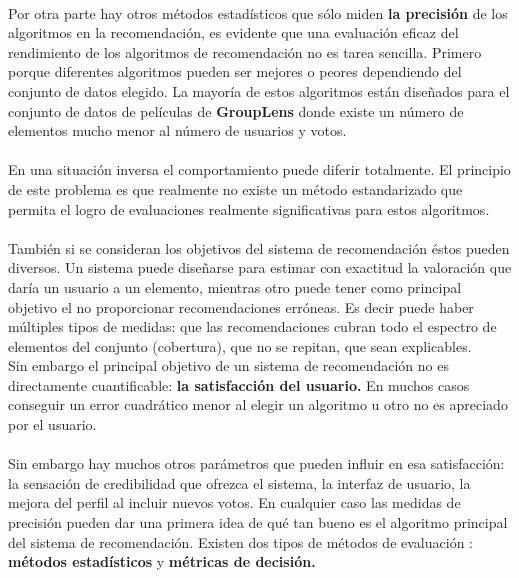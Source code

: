\documentclass[12pt,letterpaper,oneside] {memoir}
\begin{document}
\paragraph{}
Por otra parte hay otros métodos estadísticos que sólo miden \textbf{la precisión} de los algoritmos en la recomendación, es evidente que una evaluación eficaz del rendimiento de los algoritmos de recomendación no es tarea sencilla. Primero porque diferentes algoritmos pueden ser mejores o peores dependiendo del conjunto de datos elegido. La mayoría de estos algoritmos están diseñados para el conjunto de datos de películas de \textbf{GroupLens} donde existe un número de elementos mucho menor al número de usuarios y votos. 
\paragraph{}
En una situación inversa el comportamiento puede diferir totalmente. El principio de este problema es que realmente no existe un método estandarizado que permita el logro de evaluaciones realmente significativas para estos algoritmos.
\paragraph{}
También si se consideran los objetivos del sistema de recomendación éstos pueden diversos. Un sistema puede diseñarse para estimar con exactitud la valoración que daría un usuario a un elemento, mientras otro puede tener como principal objetivo el no proporcionar recomendaciones erróneas. Es decir puede haber múltiples tipos de medidas: que las recomendaciones cubran todo el espectro de elementos del conjunto (cobertura), que no se repitan, que sean explicables. \\
Sin embargo el principal objetivo de un sistema de recomendación no es directamente cuantificable: \textbf{la satisfacción del usuario.} En muchos casos conseguir un error cuadrático menor al elegir un algoritmo u otro no es apreciado por el usuario.
\paragraph{}
Sin embargo hay muchos otros parámetros que pueden influir en esa satisfacción: la sensación de credibilidad que ofrezca el sistema, la interfaz de usuario, la mejora del perfil al incluir nuevos votos.  En cualquier caso las medidas de precisión pueden dar una primera idea de qué tan bueno es el algoritmo principal del sistema de recomendación. Existen dos tipos de métodos de evaluación \citep{GalanNieto1994}: \textbf{métodos estadísticos} y \textbf{métricas de decisión.}
\end{document}
